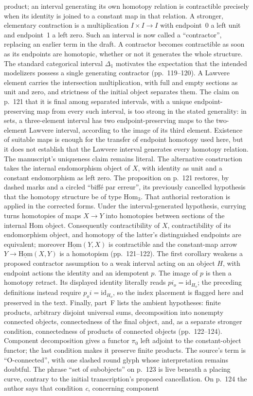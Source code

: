 \documentclass[10pt,oneside]{book}
\begin{document}
product; an interval generating its own homotopy relation is contractible precisely when its identity is joined to a constant map in that relation. A stronger, elementary contraction is a multiplication $I\times I\to I$ with endpoint~0 a left unit and endpoint~1 a left zero. Such an interval is now called a ``contractor'', replacing an earlier term in the draft. A contractor becomes contractible as soon as its endpoints are homotopic, whether or not it generates the whole structure. The standard categorical interval $\Delta_1$ motivates the expectation that the intended modelizers possess a single generating contractor (pp.~119--120). A Lawvere element carries the intersection multiplication, with full and empty sections as unit and zero, and strictness of the initial object separates them. The claim on p.~121 that it is final among separated intervals, with a unique endpoint-preserving map from every such interval, is too strong in the stated generality: in sets, a three-element interval has two endpoint-preserving maps to the two-element Lawvere interval, according to the image of its third element. Existence of suitable maps is enough for the transfer of endpoint homotopy used here, but it does not establish that the Lawvere interval generates every homotopy relation. The manuscript's uniqueness claim remains literal. The alternative construction takes the internal endomorphism object of $X$, with identity as unit and a constant endomorphism as left zero. The proposition on p.~121 restores, by dashed marks and a circled ``biffé par erreur'', its previously cancelled hypothesis that the homotopy structure be of type $\mathrm{Hom}_3$. That authorial restoration is applied in the corrected forms. Under the interval-generated hypothesis, currying turns homotopies of maps $X\to Y$ into homotopies between sections of the internal Hom object. Consequently contractibility of $X$, contractibility of its endomorphism object, and homotopy of the latter's distinguished endpoints are equivalent; moreover $\underline{\mathrm{Hom}}(Y,X)$ is contractible and the constant-map arrow $Y\to\underline{\mathrm{Hom}}(X,Y)$ is a homotopism (pp.~121--122). The first corollary weakens a proposed contractor assumption to a weak interval acting on an object $H$, with endpoint actions the identity and an idempotent $p$. The image of $p$ is then a homotopy retract. Its displayed identity literally reads $pi_o=\mathrm{id}_{H_o}$; the preceding definitions instead require $p_oi=\mathrm{id}_{H_o}$, so the index placement is flagged here and preserved in the text. Finally, part~F lists the ambient hypotheses: finite products, arbitrary disjoint universal sums, decomposition into nonempty connected objects, connectedness of the final object, and, as a separate stronger condition, connectedness of products of connected objects (pp.~122--124). Component decomposition gives a functor $\pi_0$ left adjoint to the constant-object functor; the last condition makes it preserve finite products. The source's term is ``O-connected'', with one slashed round glyph whose interpretation remains doubtful. The phrase ``set of subobjects'' on p.~123 is live beneath a placing curve, contrary to the initial transcription's proposed cancellation. On p.~124 the author says that condition \emph{c}, concerning component 
\end{document}
